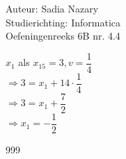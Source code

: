 \documentclass[a4paper]{article}
\begin{document}
  
\noindent \large Auteur: Sadia Nazary \\
\noindent \large Studierichting: Informatica\\
\noindent \large Oefeningenreeks 6B nr. 4.4\\

\medskip
\normalsize

$x_1$ als $x_{15} = 3, v = \dfrac{1}{4}$\\

$\Rightarrow 3 = x_1 + 14 \cdot \dfrac{1}{4}$\\

$\Rightarrow 3 = x_1 + \dfrac{7}{2}$\\

$\Rightarrow x_1 = -\dfrac{1}{2}$\\


\begin{thebibliography}{999}
\end{thebibliography}
\end{document}
